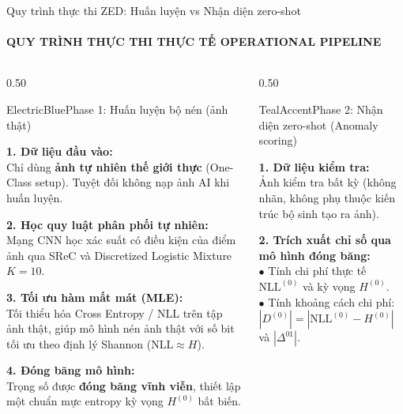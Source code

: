 \documentclass[aspectratio=169, 10pt, t]{beamer}
\begin{document}
\begin{frame}{Quy trình thực thi ZED: Huấn luyện vs Nhận diện zero-shot}
  \framesubtitle{QUY TRÌNH THỰC THI THỰC TẾ \;\textbar\; OPERATIONAL PIPELINE}
  \begin{columns}[t]
    \begin{column}{0.50\textwidth}
      \begin{accentbox}[equal height group=pipeexec]{ElectricBlue}{Phase 1: Huấn luyện bộ nén (ảnh thật)}
        \raggedright\scriptsize
        \textbf{1. Dữ liệu đầu vào:}\\
        Chỉ dùng \textbf{ảnh tự nhiên thế giới thực} (One-Class setup). Tuyệt đối không nạp ảnh AI khi huấn luyện.
        \vspace{0.18em}

        \textbf{2. Học quy luật phân phối tự nhiên:}\\
        Mạng CNN học xác suất có điều kiện của điểm ảnh qua SReC và Discretized Logistic Mixture $K=10$.
        \vspace{0.18em}

        \textbf{3. Tối ưu hàm mất mát (MLE):}\\
        Tối thiểu hóa Cross Entropy / NLL trên tập ảnh thật, giúp mô hình nén ảnh thật với số bit tối ưu theo định lý Shannon ($\text{NLL} \approx H$).
        \vspace{0.18em}

        \textbf{4. Đóng băng mô hình:}\\
        Trọng số được \textbf{đóng băng vĩnh viễn}, thiết lập một chuẩn mực entropy kỳ vọng $H^{(0)}$ bất biến.
      \end{accentbox}
    \end{column}
    \begin{column}{0.50\textwidth}
      \begin{accentbox}[equal height group=pipeexec]{TealAccent}{Phase 2: Nhận diện zero-shot (Anomaly scoring)}
        \raggedright\scriptsize
        \textbf{1. Dữ liệu kiểm tra:}\\
        Ảnh kiểm tra bất kỳ (không nhãn, không phụ thuộc kiến trúc bộ sinh tạo ra ảnh).
        \vspace{0.18em}

        \textbf{2. Trích xuất chỉ số qua mô hình đóng băng:}\\
        $\bullet$ Tính chi phí thực tế $\text{NLL}^{(0)}$ và kỳ vọng $H^{(0)}$.\\
        $\bullet$ Tính khoảng cách chi phí: $|D^{(0)}| = |\text{NLL}^{(0)} - H^{(0)}|$ và $|\Delta^{01}|$.
        \vspace{0.18em}


\end{accentbox}
\end{column}
\end{columns}
\end{frame}
\end{document}
